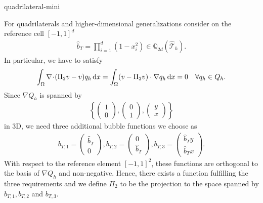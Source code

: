 \begin{Problem}{quadrilateral-mini}
\begin{solution}
  For quadrilaterals and higher-dimensional generalizations consider
  on the reference cell $[-1,1]^d$
  \begin{align*}
    \hat{b}_T=\prod_{i=1}^d(1-x_i^2)\in \mathbb{Q}_{2d}(\hat{\mathcal{T}}_h).
  \end{align*}
  In particular, we have to satisfy
  \begin{gather*}
    \int_\Omega \nabla\!\cdot\!(\Pi_2 v-v) q_h \,\mathrm{d} x
    = \int_\Omega (v-\Pi_2v)\cdot\nabla q_h\,\mathrm{d} x
    = 0 \quad \forall q_h\in Q_h.
  \end{gather*}
  Since $\nabla Q_h$ is spanned by
  \begin{align*}
    \left\{
      \begin{pmatrix} 1 \\0 \end{pmatrix},
      \begin{pmatrix} 0 \\1 \end{pmatrix},
      \begin{pmatrix} y \\x \end{pmatrix}
    \right\}
  \end{align*}
  in 3D, we need three additional bubble functions we choose as
  \begin{align*}
    b_{T,1}= \begin{pmatrix} \hat{b}_T   \\ 0         \end{pmatrix},
    b_{T,2}= \begin{pmatrix}         0   \\ \hat{b}_T \end{pmatrix},
    b_{T,3}= \begin{pmatrix} \hat{b}_T y \\ \hat{b}_T x \end{pmatrix}.
  \end{align*}
  With respect to the reference element $[-1,1]^2$, these functions are orthogonal
  to the basis of $\nabla Q_h$ and non-negative. Hence, there exists a function
  fulfilling the three requirements and we define $\Pi_2$ to be the projection to the
  space spanned by $b_{T,1}, b_{T,2}$ and $b_{T,3}$.
\end{solution}
\end{Problem}

